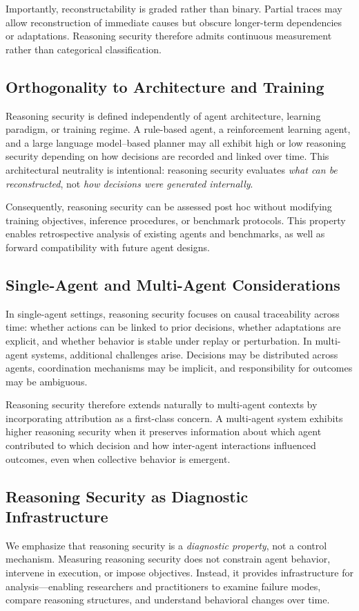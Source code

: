 Importantly, reconstructability is graded rather than binary. Partial traces may allow reconstruction of immediate causes but obscure longer-term dependencies or adaptations. Reasoning security therefore admits continuous measurement rather than categorical classification.

\subsection{Orthogonality to Architecture and Training}
Reasoning security is defined independently of agent architecture, learning paradigm, or training regime. A rule-based agent, a reinforcement learning agent, and a large language model--based planner may all exhibit high or low reasoning security depending on how decisions are recorded and linked over time. This architectural neutrality is intentional: reasoning security evaluates \emph{what can be reconstructed}, not \emph{how decisions were generated internally}.

Consequently, reasoning security can be assessed post hoc without modifying training objectives, inference procedures, or benchmark protocols. This property enables retrospective analysis of existing agents and benchmarks, as well as forward compatibility with future agent designs.

\subsection{Single-Agent and Multi-Agent Considerations}
In single-agent settings, reasoning security focuses on causal traceability across time: whether actions can be linked to prior decisions, whether adaptations are explicit, and whether behavior is stable under replay or perturbation. In multi-agent systems, additional challenges arise. Decisions may be distributed across agents, coordination mechanisms may be implicit, and responsibility for outcomes may be ambiguous.

Reasoning security therefore extends naturally to multi-agent contexts by incorporating attribution as a first-class concern. A multi-agent system exhibits higher reasoning security when it preserves information about which agent contributed to which decision and how inter-agent interactions influenced outcomes, even when collective behavior is emergent.

\subsection{Reasoning Security as Diagnostic Infrastructure}
We emphasize that reasoning security is a \emph{diagnostic property}, not a control mechanism. Measuring reasoning security does not constrain agent behavior, intervene in execution, or impose objectives. Instead, it provides infrastructure for analysis---enabling researchers and practitioners to examine failure modes, compare reasoning structures, and understand behavioral changes over time.

